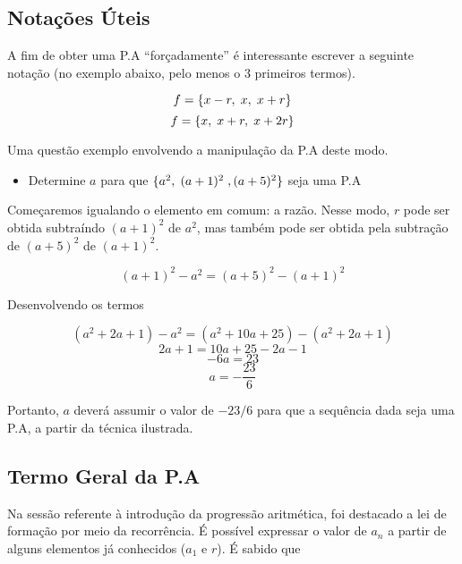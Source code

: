 \documentclass[11pt]{article}
\begin{document}
\subsection{Notações Úteis}

A fim de obter uma P.A ``forçadamente'' é interessante escrever a seguinte notação (no exemplo abaixo, pelo menos o 3 primeiros termos).

\begin{tcolorbox}[colback=LightGreen]
\[f = \{x - r,\hspace{0.1cm} x,\hspace{0.1cm} x + r\}\]
\[f = \{x,\hspace{0.1cm} x + r,\hspace{0.1cm} x + 2r\}\]
\end{tcolorbox}

Uma questão exemplo envolvendo a manipulação da P.A deste modo.

\begin{tcolorbox}[colback=LightYellow]
\begin{itemize}
  \item Determine $a$ para que $\{a^{2},\hspace{0.1cm} (a + 1)^{2}\hspace{0.1cm}, (a + 5)^{2}\}$ seja uma P.A
\end{itemize}
\end{tcolorbox}

\begin{tcolorbox}[colback=LightYellow]
Começaremos igualando o elemento em comum: a razão. Nesse modo, $r$ pode ser obtida subtraíndo $(a + 1)^{2}$ de $a^{2}$, mas também pode ser obtida pela subtração de $(a + 5)^{2}$ de $(a + 1)^{2}$.

\[(a + 1)^{2} - a^{2} = (a + 5)^{2} - (a + 1)^{2}\]

Desenvolvendo os termos

\[(a^{2} + 2a + 1) - a^{2} = (a^{2} + 10a + 25) - (a^{2} + 2a + 1)\]
\[2a + 1 = 10a + 25 - 2a - 1\]
\[-6a = 23\]
\[a = -\frac{23}{6}\]

Portanto, $a$ deverá assumir o valor de $-23/6$ para que a sequência dada seja uma P.A, a partir da técnica ilustrada.
\end{tcolorbox}

\subsection{Termo Geral da P.A}

Na sessão referente à introdução da progressão aritmética, foi destacado a lei de formação por meio da recorrência. É possível expressar o valor de $a_{n}$ a partir de alguns elementos já conhecidos ($a_{1}$ e $r$). É sabido que
\end{document}
